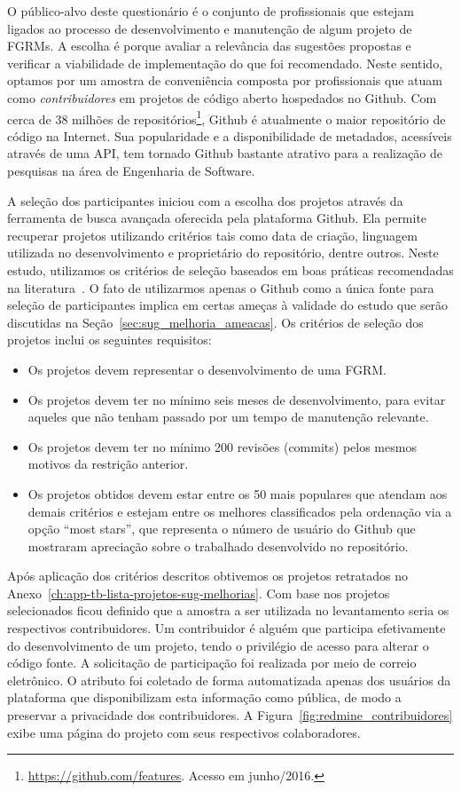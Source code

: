 O público-alvo deste questionário é o conjunto de profissionais que estejam
ligados ao processo de desenvolvimento e manutenção de algum projeto de FGRMs.
A escolha é porque avaliar a relevância das sugestões propostas e verificar a
viabilidade de implementação do que foi recomendado. Neste sentido, optamos por
um amostra de conveniência composta por profissionais que atuam como
\textit{contribuidores} em projetos de código aberto hospedados no Github. Com
cerca de 38 milhões de repositórios\footnote{\url{https://github.com/features}.
    Acesso em junho/2016.}, Github é atualmente o maior repositório de código na
Internet.  Sua popularidade e a disponibilidade de metadados, acessíveis através
de uma API, tem tornado Github bastante atrativo para a realização de pesquisas
na área de Engenharia de Software.

A seleção dos participantes iniciou com a escolha dos projetos através da
ferramenta de busca avançada oferecida pela plataforma Github. Ela permite
recuperar projetos utilizando critérios tais como data de criação, linguagem
utilizada no desenvolvimento e proprietário do repositório, dentre outros. Neste
estudo, utilizamos os critérios de seleção baseados em boas práticas
recomendadas na literatura~\cite{Bird2009}. O fato de utilizarmos apenas o
Github como a única fonte para seleção de participantes implica em certas ameças
à validade do estudo que serão discutidas na
Seção~\ref{sec:sug_melhoria_ameacas}. Os critérios de seleção dos projetos
inclui os seguintes requisitos:

\begin{itemize}
	\item Os projetos devem representar o desenvolvimento de uma FGRM\@.
    \item Os projetos devem ter no mínimo seis meses de desenvolvimento, para
        evitar aqueles que não tenham passado por um tempo de manutenção
        relevante.
	\item Os projetos devem  ter  no  mínimo  200  revisões (commits)  pelos
		mesmos motivos  da restrição anterior.
    \item Os projetos obtidos devem estar entre os 50 mais populares que atendam
        aos demais critérios e estejam entre os melhores classificados pela
        ordenação via a opção ``most stars'', que representa o número de usuário
        do Github que mostraram apreciação sobre o trabalhado desenvolvido no
        repositório.
\end{itemize}

Após aplicação dos critérios descritos obtivemos os projetos retratados no
Anexo~\ref{ch:app-tb-lista-projetos-sug-melhorias}. Com base nos projetos
selecionados ficou definido que a amostra a ser utilizada no levantamento seria
os respectivos contribuidores. Um contribuidor é alguém que participa
efetivamente do desenvolvimento de um projeto, tendo o privilégio de acesso para
alterar o código fonte. A solicitação de participação foi realizada por meio de
correio eletrônico. O atributo foi coletado de forma automatizada apenas dos
usuários da plataforma que disponibilizam esta informação como pública, de modo
a preservar a privacidade dos contribuidores. A
Figura~\ref{fig:redmine_contribuidores} exibe uma página do projeto com seus
respectivos colaboradores.

